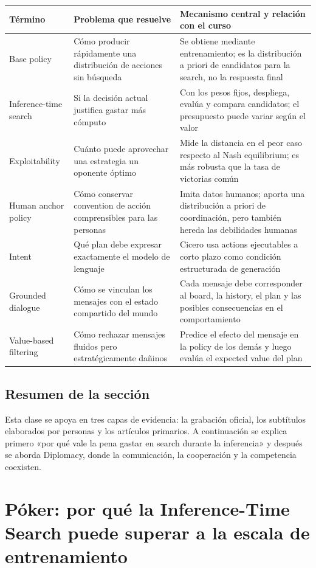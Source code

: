 \documentclass[a4paper]{article}
\begin{document}
\begin{longtable}{L{0.23\textwidth}L{0.30\textwidth}L{0.37\textwidth}}
\toprule
Término & Problema que resuelve & Mecanismo central y relación con el curso \\
\midrule
Base policy & Cómo producir rápidamente una distribución de acciones sin búsqueda & Se obtiene mediante entrenamiento; es la distribución a priori de candidatos para la search, no la respuesta final \\
Inference-time search & Si la decisión actual justifica gastar más cómputo & Con los pesos fijos, despliega, evalúa y compara candidatos; el presupuesto puede variar según el valor \\
Exploitability & Cuánto puede aprovechar una estrategia un oponente óptimo & Mide la distancia en el peor caso respecto al Nash equilibrium; es más robusta que la tasa de victorias común \\
Human anchor policy & Cómo conservar convention de acción comprensibles para las personas & Imita datos humanos; aporta una distribución a priori de coordinación, pero también hereda las debilidades humanas \\
Intent & Qué plan debe expresar exactamente el modelo de lenguaje & Cicero usa actions ejecutables a corto plazo como condición estructurada de generación \\
Grounded dialogue & Cómo se vinculan los mensajes con el estado compartido del mundo & Cada mensaje debe corresponder al board, la history, el plan y las posibles consecuencias en el comportamiento \\
Value-based filtering & Cómo rechazar mensajes fluidos pero estratégicamente dañinos & Predice el efecto del mensaje en la policy de los demás y luego evalúa el expected value del plan \\
\bottomrule
\end{longtable}

\subsection{Resumen de la sección}

Esta clase se apoya en tres capas de evidencia: la grabación oficial, los subtítulos elaborados por personas y los artículos primarios. A continuación se explica primero «por qué vale la pena gastar en search durante la inferencia» y después se aborda Diplomacy, donde la comunicación, la cooperación y la competencia coexisten.
\section{Póker: por qué la Inference-Time Search puede superar a la escala de entrenamiento}
\end{document}

